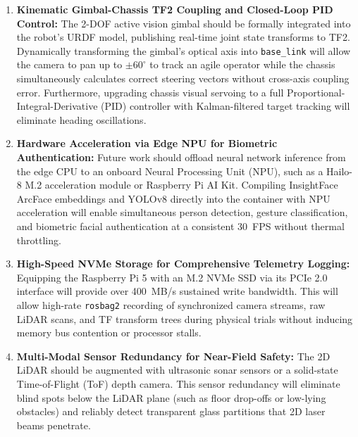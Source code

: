 \begin{enumerate}
\begin{itemize}
    \end{itemize}
    \item \textbf{Kinematic Gimbal-Chassis TF2 Coupling and Closed-Loop PID Control:} The 2-DOF active vision gimbal should be formally integrated into the robot's URDF model, publishing real-time joint state transforms to TF2. Dynamically transforming the gimbal's optical axis into \texttt{base\_link} will allow the camera to pan up to $\pm 60^\circ$ to track an agile operator while the chassis simultaneously calculates correct steering vectors without cross-axis coupling error. Furthermore, upgrading chassis visual servoing to a full Proportional-Integral-Derivative (PID) controller with Kalman-filtered target tracking will eliminate heading oscillations.
    \item \textbf{Hardware Acceleration via Edge NPU for Biometric Authentication:} Future work should offload neural network inference from the edge CPU to an onboard Neural Processing Unit (NPU), such as a Hailo-8 M.2 acceleration module or Raspberry Pi AI Kit. Compiling InsightFace ArcFace embeddings and YOLOv8 directly into the container with NPU acceleration will enable simultaneous person detection, gesture classification, and biometric facial authentication at a consistent 30~FPS without thermal throttling.
    \item \textbf{High-Speed NVMe Storage for Comprehensive Telemetry Logging:} Equipping the Raspberry Pi 5 with an M.2 NVMe SSD via its PCIe 2.0 interface will provide over 400~MB/s sustained write bandwidth. This will allow high-rate \texttt{rosbag2} recording of synchronized camera streams, raw LiDAR scans, and TF transform trees during physical trials without inducing memory bus contention or processor stalls.
    \item \textbf{Multi-Modal Sensor Redundancy for Near-Field Safety:} The 2D LiDAR should be augmented with ultrasonic sonar sensors or a solid-state Time-of-Flight (ToF) depth camera. This sensor redundancy will eliminate blind spots below the LiDAR plane (such as floor drop-offs or low-lying obstacles) and reliably detect transparent glass partitions that 2D laser beams penetrate.
\end{enumerate}
